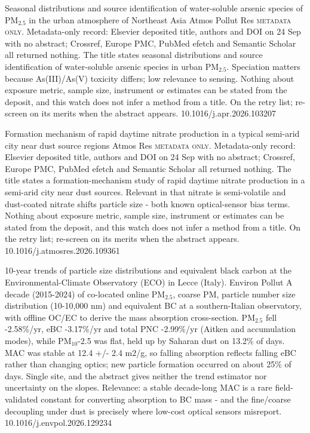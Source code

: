 \documentclass[10pt]{article}
\begin{document}
{Seasonal distributions and source identification of water-soluble arsenic species of PM$_{2.5}$ in the urban atmosphere of Northeast Asia}
{Atmos Pollut Res}
{\textsc{metadata only.} Metadata-only record: Elsevier deposited title, authors and DOI on 24 Sep with no abstract; Crossref, Europe PMC, PubMed efetch and Semantic Scholar all returned nothing. The title states seasonal distributions and source identification of water-soluble arsenic species in urban PM$_{2.5}$. Speciation matters because As(III)/As(V) toxicity differs; low relevance to sensing. Nothing about exposure metric, sample size, instrument or estimates can be stated from the deposit, and this watch does not infer a method from a title. On the retry list; re-screen on its merits when the abstract appears.}
{10.1016/j.apr.2026.103207}

{Formation mechanism of rapid daytime nitrate production in a typical semi-arid city near dust source regions}
{Atmos Res}
{\textsc{metadata only.} Metadata-only record: Elsevier deposited title, authors and DOI on 24 Sep with no abstract; Crossref, Europe PMC, PubMed efetch and Semantic Scholar all returned nothing. The title states a formation-mechanism study of rapid daytime nitrate production in a semi-arid city near dust sources. Relevant in that nitrate is semi-volatile and dust-coated nitrate shifts particle size - both known optical-sensor bias terms. Nothing about exposure metric, sample size, instrument or estimates can be stated from the deposit, and this watch does not infer a method from a title. On the retry list; re-screen on its merits when the abstract appears.}
{10.1016/j.atmosres.2026.109361}


{10-year trends of particle size distributions and equivalent black carbon at the Environmental-Climate Observatory (ECO) in Lecce (Italy).}
{Environ Pollut}
{A decade (2015-2024) of co-located online PM$_{2.5}$, coarse PM, particle number size distribution (10-10,000 nm) and equivalent BC at a southern-Italian observatory, with offline OC/EC to derive the mass absorption cross-section. PM$_{2.5}$ fell -2.58\%/yr, eBC -3.17\%/yr and total PNC -2.99\%/yr (Aitken and accumulation modes), while PM$_{10}$-2.5 was flat, held up by Saharan dust on 13.2\% of days. MAC was stable at 12.4 +/- 2.4 m2/g, so falling absorption reflects falling eBC rather than changing optics; new particle formation occurred on about 25\% of days. Single site, and the abstract gives neither the trend estimator nor uncertainty on the slopes. Relevance: a stable decade-long MAC is a rare field-validated constant for converting absorption to BC mass - and the fine/coarse decoupling under dust is precisely where low-cost optical sensors misreport.}
{10.1016/j.envpol.2026.129234}
\end{document}
